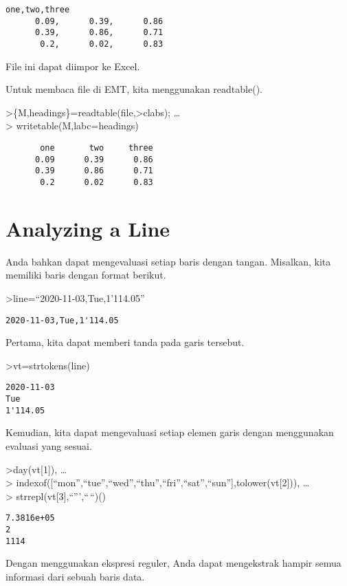 \documentclass[
]{book}
\begin{document}
\begin{verbatim}
one,two,three
      0.09,      0.39,      0.86
      0.39,      0.86,      0.71
       0.2,      0.02,      0.83
\end{verbatim}

File ini dapat diimpor ke Excel.

Untuk membaca file di EMT, kita menggunakan readtable().

\textgreater\{M,headings\}=readtable(file,\textgreater clabs); \ldots{}\\
\textgreater{} writetable(M,labc=headings)

\begin{verbatim}
       one       two     three
      0.09      0.39      0.86
      0.39      0.86      0.71
       0.2      0.02      0.83
\end{verbatim}

\section{Analyzing a Line}\label{analyzing-a-line}

Anda bahkan dapat mengevaluasi setiap baris dengan tangan. Misalkan, kita memiliki baris dengan format berikut.

\textgreater line=``2020-11-03,Tue,1'114.05''

\begin{verbatim}
2020-11-03,Tue,1'114.05
\end{verbatim}

Pertama, kita dapat memberi tanda pada garis tersebut.

\textgreater vt=strtokens(line)

\begin{verbatim}
2020-11-03
Tue
1'114.05
\end{verbatim}

Kemudian, kita dapat mengevaluasi setiap elemen garis dengan menggunakan evaluasi yang sesuai.

\textgreater day(vt{[}1{]}), \ldots{}\\
\textgreater{} indexof({[}``mon'',``tue'',``wed'',``thu'',``fri'',``sat'',``sun''{]},tolower(vt{[}2{]})), \ldots{}\\
\textgreater{} strrepl(vt{[}3{]},``''',``\,``)()

\begin{verbatim}
7.3816e+05
2
1114
\end{verbatim}

Dengan menggunakan ekspresi reguler, Anda dapat mengekstrak hampir semua informasi dari sebuah baris data.
\end{document}
